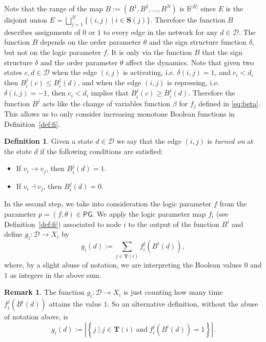 \documentclass[12pt, notitlepage]{amsart}
\newcommand{\cD}{\mathcal{D}}
\theoremstyle{definition}
\newtheorem{defn}[thm]{Definition}
\newtheorem{rem}[thm]{Remark}
\newcommand{\Targets}{\mathbf{T}}
\newcommand{\Sources}{\mathbf{S}}
\newcommand{\PG}{\mathsf{PG}}
\newcommand{\bbB}{\mathbb{B}}
\begin{document}
  Note that the range of the map $B := (B^1, B^2, \ldots, B^N)$ is $\bbB^{|E|}$ since $E$ is the disjoint union $E = \bigsqcup_{j = 1}^{N}{\{(i, j) \mid i \in \Sources(j)\}}$. Therefore the function $B$ describes assignments of $0$ or $1$ to every edge in the network for any $d \in \mathcal D$. The function $B$ depends on the order parameter $\theta$ and the sign structure function $\delta$, but not on the logic parameter $f$. It is only via the function $B$ that the sign structure $\delta$ and the order parameter $\theta$ affect the dynamics. Note that given two states $c, d \in \cD$ when the edge $(i, j)$ is activating, i.e. $\delta(i, j) = 1$, and $c_i < d_i$ then $B^j_i(c) \leq B^j_i(d)$, and when the edge $(i, j)$ is repressing, i.e. $\delta(i, j) = -1$, then  $c_i < d_i$ implies that $B^j_i(c) \geq B^j_i(d)$. Therefore the function $B^j$ acts like the change of variables function $\beta$ for $f_j$ defined in \eqref{eq:beta}. This allows us to only consider increasing monotone Boolean functions in Definition~\ref{def:fi}.

  \begin{defn}
    \label{def:turn_on}
    Given a state $d \in \cD$ we say that the edge $(i, j)$ is \emph{turned on} at the state $d$ if the following conditions are satisfied:
    \begin{itemize}
      \item If $v_i \to v_j$, then $B_i^j(d) = 1$.
      \item If $v_i \dashv v_j$, then $B_i^j(d) = 0$.
    \end{itemize}
  \end{defn}

  In the second step, we take into consideration the logic parameter $f$ from the parameter $p = (f, \theta) \in \PG$. We apply the logic parameter map $f_i$ (see Definition~\ref{def:fi}) associated to node $i$ to the output of the function $B^i$ and define $g_i \colon \mathcal{D} \to X_i$ by
  \begin{equation}
    \label{Psi}
    g_i(d) := \sum_{j \in \Targets(i)} f_i^j(B^i(d)),
  \end{equation}
  where, by a slight abuse of notation, we are interpreting the Boolean values $0$ and $1$ as integers in the above sum.

  \begin{rem}
    The function $g_i \colon \mathcal{D} \to X_i$ is just counting how many time $f_i^j(B^i(d))$ attains the value $1$. So an alternative definition, without the abuse of notation above, is
    \[
      g_i(d) := \left| \left\{ j \mid j \in \Targets(i) ~\text{and}~ f_i^j(B^i(d)) = 1 \right\} \right|.
    \]
  \end{rem}
\end{document}
